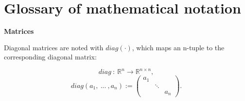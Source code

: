 \section*{Glossary of mathematical notation}

\textbf{Matrices}

Diagonal matrices are noted with $diag(\cdot)$, which maps an n-tuple to the corresponding diagonal matrix:

\begin{equation*}
diag \: : \: \mathbb{R}^{n} \rightarrow \mathbb{R}^{n \times n},
\end{equation*}
\begin{equation*}
diag(a_1,\: ... \:, a_n ) := 
\begin{pmatrix}
    a_{1} & & \\
    & \ddots & \\
    & & a_{n}
  \end{pmatrix}.
  \end{equation*}





 








